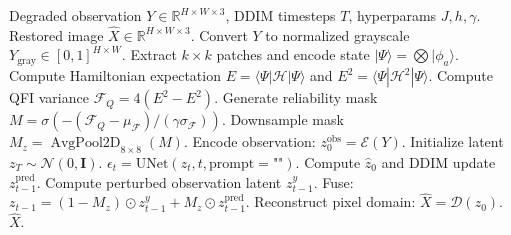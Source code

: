 \documentclass[10pt,journal,compsoc]{IEEEtran}
\begin{document}
\begin{algorithm}[t]
\caption{QFI-Diff End-to-End Restoration Pipeline}
\label{alg:qfidiff}
\begin{algorithmic}[1]
\REQUIRE Degraded observation $Y \in \mathbb{R}^{H \times W \times 3}$, DDIM timesteps $T$, hyperparams $J, h, \gamma$.
\ENSURE Restored image $\hat{X} \in \mathbb{R}^{H \times W \times 3}$.
\STATE Convert $Y$ to normalized grayscale $Y_{\text{gray}} \in [0, 1]^{H \times W}$.
\STATE Extract $k \times k$ patches and encode state $|\Psi\rangle = \bigotimes |\phi_a\rangle$.
\STATE Compute Hamiltonian expectation $E = \langle \Psi | \mathcal{H} | \Psi \rangle$ and $E^2 = \langle \Psi | \mathcal{H}^2 | \Psi \rangle$.
\STATE Compute QFI variance $\mathcal{F}_Q = 4(E^2 - E^2)$.
\STATE Generate reliability mask $M = \sigma\left(-(\mathcal{F}_Q - \mu_{\mathcal{F}})/(\gamma \sigma_{\mathcal{F}})\right)$.
\STATE Downsample mask $M_z = \operatorname{AvgPool2D}_{8\times 8}(M)$.
\STATE Encode observation: $z_0^{\text{obs}} = \mathcal{E}(Y)$.
\STATE Initialize latent $z_T \sim \mathcal{N}(0, \mathbf{I})$.
    \STATE $\epsilon_t = \text{UNet}(z_t, t, \text{prompt}=\text{""})$.
    \STATE Compute $\hat{z}_0$ and DDIM update $z_{t-1}^{\text{pred}}$.
    \STATE Compute perturbed observation latent $z_{t-1}^y$.
    \STATE Fuse: $z_{t-1} = (1 - M_z) \odot z_{t-1}^y + M_z \odot z_{t-1}^{\text{pred}}$.
\ENDFOR
\STATE Reconstruct pixel domain: $\hat{X} = \mathcal{D}(z_0)$.
\RETURN $\hat{X}$.
\end{algorithmic}
\end{algorithm}
\end{document}
